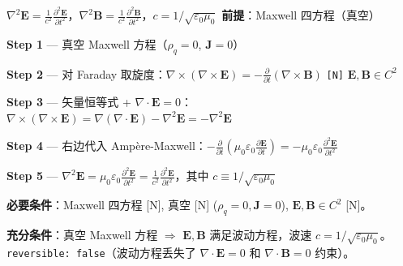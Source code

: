 \begin{lawbox}[电磁波方程]
  $\nabla^2\mathbf{E} = \frac{1}{c^2}\frac{\partial^2\mathbf{E}}{\partial t^2}$，$\nabla^2\mathbf{B} = \frac{1}{c^2}\frac{\partial^2\mathbf{B}}{\partial t^2}$，$c = 1/\sqrt{\varepsilon_0\mu_0}$
  \quad\textbf{前提}：Maxwell 四方程（真空）
\end{lawbox}

\begin{derivationbox}[推导]
  \textbf{Step 1} — 真空 Maxwell 方程（$\rho_q=0$, $\mathbf{J}=0$）

  \textbf{Step 2} — 对 Faraday 取旋度：$\nabla\times(\nabla\times\mathbf{E}) = -\frac{\partial}{\partial t}(\nabla\times\mathbf{B})$
  \texttt{[N]} $\mathbf{E},\mathbf{B} \in C^2$

  \textbf{Step 3} — 矢量恒等式 + $\nabla\cdot\mathbf{E}=0$：$\nabla\times(\nabla\times\mathbf{E}) = \nabla(\nabla\cdot\mathbf{E}) - \nabla^2\mathbf{E} = -\nabla^2\mathbf{E}$

  \textbf{Step 4} — 右边代入 Amp\`{e}re-Maxwell：$-\frac{\partial}{\partial t}(\mu_0\varepsilon_0\frac{\partial\mathbf{E}}{\partial t}) = -\mu_0\varepsilon_0\frac{\partial^2\mathbf{E}}{\partial t^2}$

  \textbf{Step 5} — $\nabla^2\mathbf{E} = \mu_0\varepsilon_0\frac{\partial^2\mathbf{E}}{\partial t^2} = \frac{1}{c^2}\frac{\partial^2\mathbf{E}}{\partial t^2}$，其中 $c \equiv 1/\sqrt{\varepsilon_0\mu_0}$
\end{derivationbox}

\textbf{必要条件}：Maxwell 四方程 [N], 真空 [N] ($\rho_q=0,\mathbf{J}=0$), $\mathbf{E},\mathbf{B} \in C^2$ [N]。

\textbf{充分条件}：真空 Maxwell 方程 $\Rightarrow$ $\mathbf{E},\mathbf{B}$ 满足波动方程，波速 $c = 1/\sqrt{\varepsilon_0\mu_0}$。\texttt{reversible: false}（波动方程丢失了 $\nabla\cdot\mathbf{E}=0$ 和 $\nabla\cdot\mathbf{B}=0$ 约束）。


